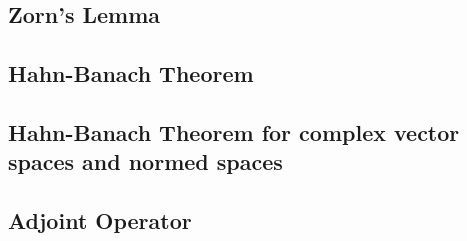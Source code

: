 \subsection{Zorn's Lemma}
\subsection{Hahn-Banach Theorem}
\subsection{Hahn-Banach Theorem for complex vector spaces and normed spaces}
\setcounter{subsection}{4}
\subsection{Adjoint Operator}
